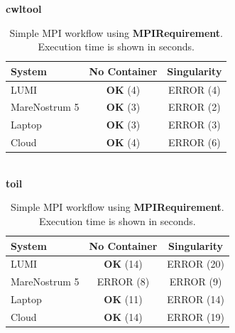 \documentclass{article}
\begin{document}
\begin{table}[ht!]
\centering
\renewcommand{\arraystretch}{1.2}
\textbf{cwltool}\\[0.2cm]
\begin{tabular}{|l|c|c|}
\hline
\rowcolor{lightgray!50}
\textbf{System} & \textbf{No Container} & \textbf{Singularity} \\
\hline
LUMI & \textbf{OK} (4) & ERROR (4) \\
MareNostrum 5 & \textbf{OK} (3) & ERROR (2) \\
Laptop & \textbf{OK} (3) & ERROR (3) \\
Cloud & \textbf{OK} (4) & ERROR (6) \\
\hline
\end{tabular}
\\[0.6cm]
\textbf{toil}\\[0.2cm]
\begin{tabular}{|l|c|c|}
\hline
\rowcolor{lightgray!50}
\textbf{System} & \textbf{No Container} & \textbf{Singularity} \\
\hline
LUMI & \textbf{OK} (14) & ERROR (20) \\
MareNostrum 5 & ERROR (8) & ERROR (9) \\
Laptop & \textbf{OK} (11) & ERROR (14) \\
Cloud & \textbf{OK} (14) & ERROR (19) \\
\hline
\end{tabular}
\\[0.6cm]
\caption{Simple MPI workflow using \protect\textbf{MPIRequirement}. Execution time is shown in seconds.}
\label{table:workflow-req}
\end{table}
\end{document}
